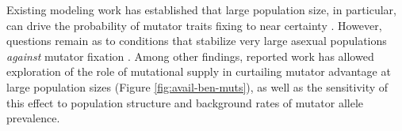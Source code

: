 Existing modeling work has established that large population size, in particular, can drive the probability of mutator traits fixing to near certainty \citep{raynes2018sign,tenaillon1999mutators}.
However, questions remain as to conditions that stabilize very large asexual populations \textit{against} mutator fixation \citep{raynes2019migration}.
Among other findings, reported work has allowed exploration of the role of mutational supply in curtailing mutator advantage at large population sizes (Figure \ref{fig:avail-ben-muts}), as well as the sensitivity of this effect to population structure and background rates of mutator allele prevalence.




